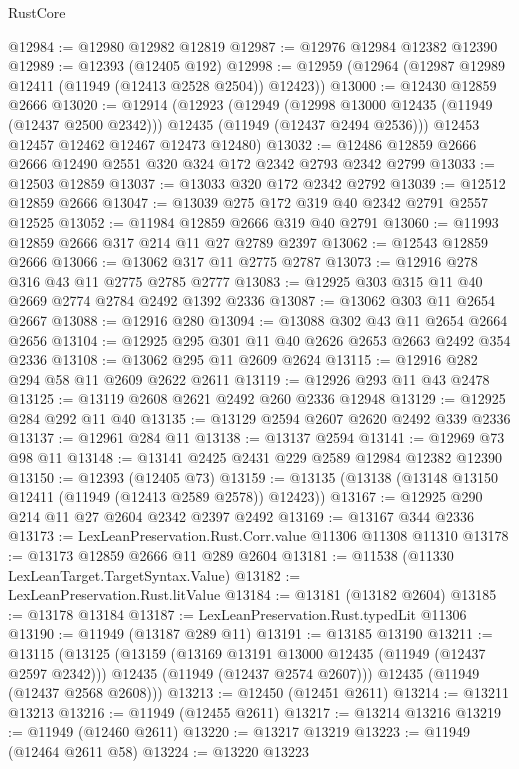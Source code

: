 \begin{lexlean}{RustCore}
\begin{coremodule}
@12984 := @12980 @12982 @12819
@12987 := @12976 @12984 @12382 @12390
@12989 := @12393 (@12405 @192)
@12998 := @12959 (@12964 (@12987 @12989 @12411 (@11949 (@12413 @2528 @2504)) @12423))
@13000 := @12430 @12859 @2666
@13020 := @12914
    (@12923
      (@12949
        (@12998 @13000 @12435 (@11949 (@12437 @2500 @2342)))
        @12435
        (@11949 (@12437 @2494 @2536)))
      @12453
      @12457
      @12462
      @12467
      @12473
      @12480)
@13032 := @12486 @12859 @2666 @2666 @12490 @2551 @320 @324 @172 @2342 @2793 @2342 @2799
@13033 := @12503 @12859
@13037 := @13033 @320 @172 @2342 @2792
@13039 := @12512 @12859 @2666
@13047 := @13039 @275 @172 @319 @40 @2342 @2791 @2557 @12525
@13052 := @11984 @12859 @2666 @319 @40 @2791
@13060 := @11993 @12859 @2666 @317 @214 @11 @27 @2789 @2397
@13062 := @12543 @12859 @2666
@13066 := @13062 @317 @11 @2775 @2787
@13073 := @12916 @278 @316 @43 @11 @2775 @2785 @2777
@13083 := @12925 @303 @315 @11 @40 @2669 @2774 @2784 @2492 @1392 @2336
@13087 := @13062 @303 @11 @2654 @2667
@13088 := @12916 @280
@13094 := @13088 @302 @43 @11 @2654 @2664 @2656
@13104 := @12925 @295 @301 @11 @40 @2626 @2653 @2663 @2492 @354 @2336
@13108 := @13062 @295 @11 @2609 @2624
@13115 := @12916 @282 @294 @58 @11 @2609 @2622 @2611
@13119 := @12926 @293 @11 @43 @2478
@13125 := @13119 @2608 @2621 @2492 @260 @2336 @12948
@13129 := @12925 @284 @292 @11 @40
@13135 := @13129 @2594 @2607 @2620 @2492 @339 @2336
@13137 := @12961 @284 @11
@13138 := @13137 @2594
@13141 := @12969 @73 @98 @11
@13148 := @13141 @2425 @2431 @229 @2589 @12984 @12382 @12390
@13150 := @12393 (@12405 @73)
@13159 := @13135 (@13138 (@13148 @13150 @12411 (@11949 (@12413 @2589 @2578)) @12423))
@13167 := @12925 @290 @214 @11 @27 @2604 @2342 @2397 @2492
@13169 := @13167 @344 @2336
@13173 := LexLeanPreservation.Rust.Corr.value @11306 @11308 @11310
@13178 := @13173 @12859 @2666 @11 @289 @2604
@13181 := @11538 (@11330 LexLeanTarget.TargetSyntax.Value)
@13182 := LexLeanPreservation.Rust.litValue
@13184 := @13181 (@13182 @2604)
@13185 := @13178 @13184
@13187 := LexLeanPreservation.Rust.typedLit @11306
@13190 := @11949 (@13187 @289 @11)
@13191 := @13185 @13190
@13211 := @13115
    (@13125
      (@13159
        (@13169 @13191 @13000 @12435 (@11949 (@12437 @2597 @2342)))
        @12435
        (@11949 (@12437 @2574 @2607)))
      @12435
      (@11949 (@12437 @2568 @2608)))
@13213 := @12450 (@12451 @2611)
@13214 := @13211 @13213
@13216 := @11949 (@12455 @2611)
@13217 := @13214 @13216
@13219 := @11949 (@12460 @2611)
@13220 := @13217 @13219
@13223 := @11949 (@12464 @2611 @58)
@13224 := @13220 @13223

\end{coremodule}
\end{lexlean}
